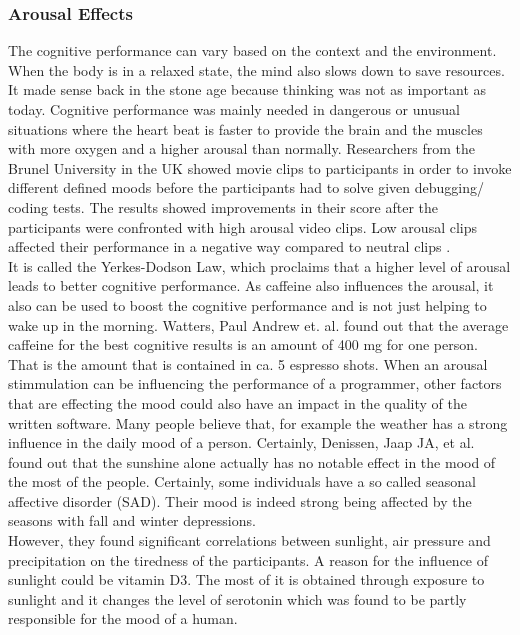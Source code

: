 \subsubsection{Arousal Effects}
The cognitive performance can vary based on the context and the environment. When the body is in a relaxed state, the mind also slows down to save resources. It made sense back in the stone age because thinking was not as important as today. Cognitive performance was mainly needed in dangerous or unusual situations where the heart beat is faster to provide the brain and the muscles with more oxygen and a higher arousal than normally.
\bigbreak
Researchers from the Brunel University in the UK showed movie clips to participants in order to invoke different defined moods before the participants had to solve given debugging/ coding tests. The results showed improvements in their score after the participants were confronted with high arousal video clips. Low arousal clips affected their performance in a negative way compared to neutral clips \cite{khan2007mood}.\\ 
It is called the Yerkes-Dodson Law, which proclaims that a higher level of arousal leads to better cognitive performance. As caffeine also influences the arousal, it also can be used to boost the cognitive performance and is not just helping to wake up in the morning. Watters, Paul Andrew et. al. \cite{watters1997caffeine} found out that the average caffeine for the best cognitive results is an amount of 400 mg for one person. That is the amount that is contained in ca. 5 espresso shots.
\bigbreak
When an arousal stimmulation can be influencing the performance of a programmer, other factors that are effecting the mood could also have an impact in the quality of the written software. Many people believe that, for example the weather has a strong influence in the daily mood of a person. Certainly, Denissen, Jaap JA, et al. \cite{denissen2008effects} found out that the sunshine alone actually has no notable effect in the mood of the most of the people. Certainly, some individuals have a so called seasonal affective disorder (SAD). Their mood is indeed strong being affected by the seasons with fall and winter depressions.\\ 
However, they found significant correlations between sunlight, air pressure and precipitation on the tiredness of the participants.
A reason for the influence of sunlight could be vitamin D3. The most of it is obtained through exposure to sunlight and it changes the level of serotonin which was found to be partly responsible for the mood of a human.

